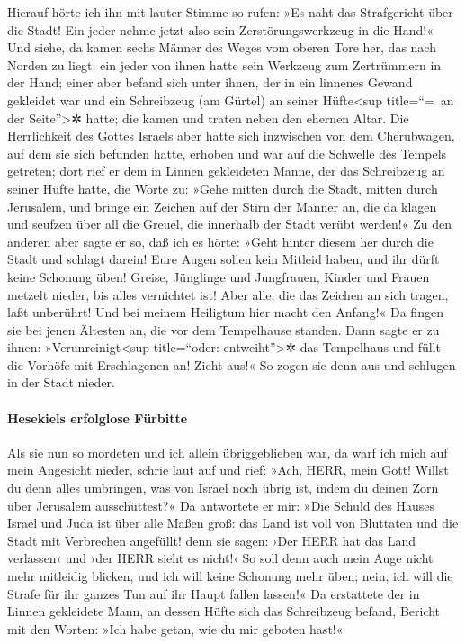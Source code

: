 Hierauf hörte ich ihn mit lauter Stimme so rufen: »Es naht
das Strafgericht über die Stadt! Ein jeder nehme jetzt also sein
Zerstörungswerkzeug in die Hand!« Und siehe, da kamen
sechs Männer des Weges vom oberen Tore her, das nach Norden zu liegt;
ein jeder von ihnen hatte sein Werkzeug zum Zertrümmern in der Hand;
einer aber befand sich unter ihnen, der in ein linnenes Gewand gekleidet
war und ein Schreibzeug (am Gürtel) an seiner Hüfte\textless sup
title=``=~an der Seite''\textgreater✲ hatte; die kamen und traten neben
den ehernen Altar. Die Herrlichkeit des Gottes Israels
aber hatte sich inzwischen von dem Cherubwagen, auf dem sie sich
befunden hatte, erhoben und war auf die Schwelle des Tempels getreten;
dort rief er dem in Linnen gekleideten Manne, der das Schreibzeug an
seiner Hüfte hatte, die Worte zu: »Gehe mitten durch die
Stadt, mitten durch Jerusalem, und bringe ein Zeichen auf der Stirn der
Männer an, die da klagen und seufzen über all die Greuel, die innerhalb
der Stadt verübt werden!« Zu den anderen aber sagte er so,
daß ich es hörte: »Geht hinter diesem her durch die Stadt und schlagt
darein! Eure Augen sollen kein Mitleid haben, und ihr dürft keine
Schonung üben! Greise, Jünglinge und Jungfrauen, Kinder
und Frauen metzelt nieder, bis alles vernichtet ist! Aber alle, die das
Zeichen an sich tragen, laßt unberührt! Und bei meinem Heiligtum hier
macht den Anfang!« Da fingen sie bei jenen Ältesten an, die vor dem
Tempelhause standen. Dann sagte er zu ihnen:
»Verunreinigt\textless sup title=``oder: entweiht''\textgreater✲ das
Tempelhaus und füllt die Vorhöfe mit Erschlagenen an! Zieht aus!« So
zogen sie denn aus und schlugen in der Stadt nieder.

\hypertarget{hesekiels-erfolglose-fuxfcrbitte}{%
\paragraph{Hesekiels erfolglose
Fürbitte}\label{hesekiels-erfolglose-fuxfcrbitte}}

Als sie nun so mordeten und ich allein übriggeblieben war,
da warf ich mich auf mein Angesicht nieder, schrie laut auf und rief:
»Ach, HERR, mein Gott! Willst du denn alles umbringen, was von Israel
noch übrig ist, indem du deinen Zorn über Jerusalem ausschüttest?«
Da antwortete er mir: »Die Schuld des Hauses Israel und
Juda ist über alle Maßen groß: das Land ist voll von Bluttaten und die
Stadt mit Verbrechen angefüllt! denn sie sagen: ›Der HERR hat das Land
verlassen‹ und ›der HERR sieht es nicht!‹ So soll denn
auch mein Auge nicht mehr mitleidig blicken, und ich will keine Schonung
mehr üben; nein, ich will die Strafe für ihr ganzes Tun auf ihr Haupt
fallen lassen!« Da erstattete der in Linnen gekleidete
Mann, an dessen Hüfte sich das Schreibzeug befand, Bericht mit den
Worten: »Ich habe getan, wie du mir geboten hast!«

